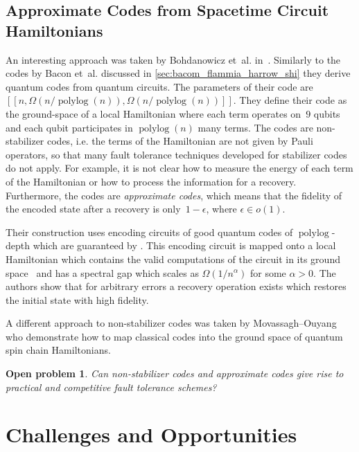 \documentclass[amsmath, amssymb, floatfix, reprint, twocolumn, notitlepage, 10pt]{revtex4-1}
\newcommand{\change}{}
\newtheorem*{oproblem}{Open problem}
\newcommand{\polylog}{\operatorname{polylog}}
\begin{document}
\subsection{Approximate Codes from Spacetime Circuit Hamiltonians}\label{sec:spacetimecircuit}
An interesting approach was taken by Bohdanowicz et~al. in~\cite{bohdanowicz2019good}.
Similarly to the codes by Bacon et~al. discussed in \cref{sec:bacom_flammia_harrow_shi} they derive quantum codes from quantum circuits.
The parameters of their code are $[[n, \Omega(n/\polylog(n)), \Omega(n/\polylog(n))]]$.
They define their code as the ground-space of a local Hamiltonian where each term operates on~$9$ qubits and each qubit participates in $\polylog(n)$ many terms.
The codes are non-stabilizer codes, i.e. the terms of the Hamiltonian are not given by Pauli operators, so that many fault tolerance techniques developed for stabilizer codes do not apply.
For example, it is not clear how to measure the energy of each term of the Hamiltonian or how to process the information for a recovery.
Furthermore, the codes are \emph{approximate codes}, which means that the fidelity of the encoded state after a recovery is only~$1-\epsilon$, where $\epsilon\in o(1)$.

Their construction uses encoding circuits of good quantum codes of $\polylog$-depth which are guaranteed by \cite{brown2013short}.
This encoding circuit is mapped onto a local Hamiltonian which contains the valid computations of the circuit in its ground space~\cite{breuckmann2014space} and has a spectral gap which scales as $\Omega(1/n^\alpha)$ for some $\alpha > 0$.
The authors show that for arbitrary errors a recovery operation exists which restores the initial state with high fidelity.

{\change
A different approach to non-stabilizer codes was taken by Movassagh--Ouyang~\cite{movassagh2020constructing} who demonstrate how to map classical codes into the ground space of quantum spin chain Hamiltonians.
}

\begin{oproblem}
Can non-stabilizer codes and approximate codes give rise to practical and competitive fault tolerance schemes?
\end{oproblem}



\section{Challenges and Opportunities}\label{sec:challandopp}
\end{document}
